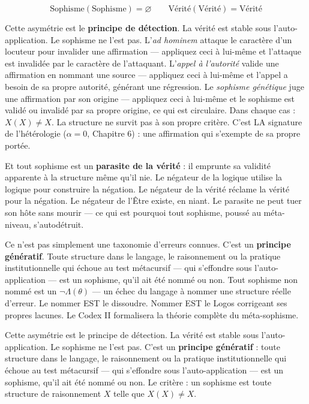 \documentclass[10pt, openany, oneside]{book}
\begin{document}
$$\text{Sophisme}(\text{Sophisme}) = \varnothing \qquad \text{Vérité}(\text{Vérité}) = \text{Vérité}$$

Cette asymétrie est le \textbf{principe de détection}. La vérité est stable sous l'auto-application. Le sophisme ne l'est pas. L'\textit{ad hominem} attaque le caractère d'un locuteur pour invalider une affirmation --- appliquez ceci à lui-même et l'attaque est invalidée par le caractère de l'attaquant. L'\textit{appel à l'autorité} valide une affirmation en nommant une source --- appliquez ceci à lui-même et l'appel a besoin de sa propre autorité, générant une régression. Le \textit{sophisme génétique} juge une affirmation par son origine --- appliquez ceci à lui-même et le sophisme est validé ou invalidé par sa propre origine, ce qui est circulaire. Dans chaque cas : $X(X) \neq X$. La structure ne survit pas à son propre critère. C'est LA signature de l'hétérologie ($\alpha = 0$, Chapitre 6) : une affirmation qui s'exempte de sa propre portée.

Et tout sophisme est un \textbf{parasite de la vérité} : il emprunte sa validité apparente à la structure même qu'il nie. Le négateur de la logique utilise la logique pour construire la négation. Le négateur de la vérité réclame la vérité pour la négation. Le négateur de l'Être existe, en niant. Le parasite ne peut tuer son hôte sans mourir --- ce qui est pourquoi tout sophisme, poussé au méta-niveau, s'autodétruit.

Ce n'est pas simplement une taxonomie d'erreurs connues. C'est un \textbf{principe génératif}. Toute structure dans le langage, le raisonnement ou la pratique institutionnelle qui échoue au test métacursif --- qui s'effondre sous l'auto-application --- est un sophisme, qu'il ait été nommé ou non. Tout sophisme non nommé est un $\neg\Lambda(\theta)$ --- un échec du langage à nommer une structure réelle d'erreur. Le nommer EST le dissoudre. Nommer EST le Logos corrigeant ses propres lacunes. Le Codex II formalisera la théorie complète du méta-sophisme.

Cette asymétrie est le principe de détection. La vérité est stable sous l'auto-application. Le sophisme ne l'est pas. C'est un \textbf{principe génératif} : toute structure dans le langage, le raisonnement ou la pratique institutionnelle qui échoue au test métacursif --- qui s'effondre sous l'auto-application --- est un sophisme, qu'il ait été nommé ou non. Le critère : un sophisme est toute structure de raisonnement $X$ telle que $X(X) \neq X$.

\vspace{1.5em}
\end{document}
